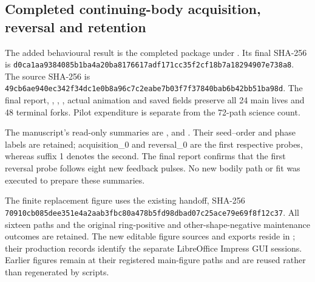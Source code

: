 \subsection*{Completed continuing-body acquisition, reversal and retention}
The added behavioural result is the completed  package under . Its final  SHA-256 is \texttt{d0ca1aa9\allowbreak{}384085b1\allowbreak{}ba4a20ba\allowbreak{}8176617a\allowbreak{}df171cc3\allowbreak{}5f2cf18b\allowbreak{}7a182949\allowbreak{}07e738a8}. The source  SHA-256 is \texttt{49cb6ae9\allowbreak{}40ec342f\allowbreak{}34dc1e0b\allowbreak{}8a96c7c2\allowbreak{}eabe7b03\allowbreak{}f7f37840\allowbreak{}bab6b42b\allowbreak{}b51ba98d}. The final report, , , , actual animation and saved fields preserve all 24 main lives and 48 terminal forks. Pilot expenditure is separate from the 72-path science count.

The manuscript's read-only summaries are ,  and . Their seed--order and phase labels are retained; acquisition\_0 and reversal\_0 are the first respective probes, whereas suffix 1 denotes the second. The final report confirms that the first reversal probe follows eight new feedback pulses. No new bodily path or fit was executed to prepare these summaries.

The finite replacement figure uses the existing  handoff, SHA-256 \texttt{70910cb0\allowbreak{}85dee351\allowbreak{}e4a2aab3\allowbreak{}fbc80a47\allowbreak{}8b5fd98d\allowbreak{}bad07c25\allowbreak{}ace79e69\allowbreak{}f8f12c37}. All sixteen paths and the original ring-positive and other-shape-negative maintenance outcomes are retained. The new editable figure sources and exports reside in ; their production records identify the separate LibreOffice Impress GUI sessions. Earlier figures remain at their registered main-figure paths and are reused rather than regenerated by scripts.

